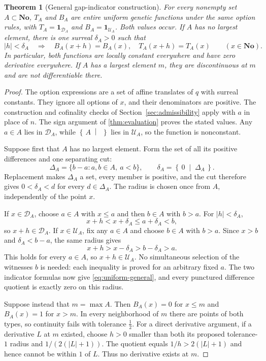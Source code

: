 \documentclass[11pt,letterpaper]{article}
\numberwithin{equation}{section}
\newtheorem{theorem}{Theorem}[section]
\theoremstyle{definition}
\theoremstyle{remark}
\newcommand{\No}{\mathbf{No}}
\newcommand{\U}{\mathcal{U}}
\newcommand{\D}{\mathcal{D}}
\newcommand{\cut}[2]{\left\{\,#1\;\middle|\;#2\,\right\}}
\newcommand{\ind}{\mathbf{1}}
\begin{document}
\begin{theorem}[General gap-indicator construction]\label{thm:general}
For every nonempty set $A\subset\No$, $T_A$ and $B_A$ are entire uniform
genetic functions under the same option rules, with
$T_A=\ind_{\D_A}$ and $B_A=\ind_{\U_A}$. Both values occur.
If $A$ has no largest element, there is one surreal $\delta_A>0$ such that
\begin{equation}\label{eq:uniform-general}
 |h|<\delta_A\quad\Longrightarrow\quad
 B_A(x+h)=B_A(x),\quad T_A(x+h)=T_A(x)
 \qquad(x\in\No).
\end{equation}
In particular, both functions are locally constant everywhere and have zero
derivative everywhere. If $A$ has a largest element $m$, they are
discontinuous at $m$ and are not differentiable there.
\end{theorem}
\begin{proof}
The option expressions are a set of affine translates of $q$ with surreal
constants. They ignore all options of $x$, and their denominators are
positive. The construction and cofinality checks of
Section~\ref{sec:admissibility} apply with $a$ in place of $n$.
The sign argument of \cref{thm:evaluation} proves the stated values.
Any $a\in A$ lies in $\D_A$, while $\cut{A}{}$ lies in $\U_A$, so the
function is nonconstant.

Suppose first that $A$ has no largest element. Form the set of all its
positive differences and one separating cut:
\[
 \Delta_A=\{b-a:a,b\in A,\ a<b\},\qquad
 \delta_A=\cut{0}{\Delta_A}.
\]
Replacement makes $\Delta_A$ a set, every member is positive, and the cut
therefore gives $0<\delta_A<d$ for every $d\in\Delta_A$. The radius is
chosen once from $A$, independently of the point $x$.

If $x\in\D_A$, choose $a\in A$ with $x\le a$ and then $b\in A$ with
$b>a$. For $|h|<\delta_A$,
\[
 x+h<x+\delta_A\le a+\delta_A<b,
\]
so $x+h\in\D_A$. If $x\in\U_A$, fix any $a\in A$ and choose $b\in A$
with $b>a$. Since $x>b$ and $\delta_A<b-a$, the same radius gives
\[
 x+h>x-\delta_A>b-\delta_A>a.
\]
This holds for every $a\in A$, so $x+h\in\U_A$. No simultaneous selection
of the witnesses $b$ is needed: each inequality is proved for an arbitrary
fixed $a$. The two indicator formulas now give \eqref{eq:uniform-general},
and every punctured difference quotient is exactly zero on this radius.

Suppose instead that $m=\max A$. Then $B_A(x)=0$ for $x\le m$ and
$B_A(x)=1$ for $x>m$. In every neighborhood of $m$ there are points of
both types, so continuity fails with tolerance $\tfrac12$.
For a direct derivative argument, if a derivative $L$ at $m$ existed,
choose $h>0$ smaller than both its proposed tolerance-$1$ radius and
$1/(2(|L|+1))$. The quotient equals $1/h>2(|L|+1)$ and hence cannot
be within $1$ of $L$. Thus no derivative exists at $m$.
\end{proof}
\end{document}
